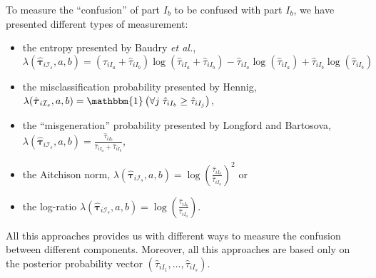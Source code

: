 \documentclass[10pt, a4paper]{article}
\newcommand{\m}[1]{\boldsymbol{#1}}
\begin{document}
To measure the ``confusion'' of part $I_b$ to be confused with part $I_b$, we have presented different types of measurement: 
\begin{itemize}
\item the entropy presented by Baudry \emph{et al.}, $\lambda(\hat{\m \tau}_{i \mathcal{I}_s}, a, b) = (\hat{\tau}_{iI_a}+\hat{\tau}_{iI_b}) \log(\hat{\tau}_{iI_a} + \hat{\tau}_{iI_b}) - \hat{\tau}_{iI_a} \log(\hat{\tau}_{iI_a}) + \hat{\tau}_{iI_b} \log(\hat{\tau}_{iI_b})$
\item the misclassification probability presented by Hennig, $\lambda(\hat{\m \tau}_{i \mathcal{I}_s}, a, b) = \mathbbm{1}\left( \forall j\; \hat{\tau}_{i I_{b}} \geq \hat{\tau}_{iI_j} \right)$,
\item the ``misgeneration'' probability presented by Longford and Bartosova, $\lambda(\hat{\m \tau}_{i \mathcal{I}_s}, a, b) = \frac{\hat{\tau}_{iI_b}}{\hat{\tau}_{iI_a} + \hat{\tau}_{iI_b}}$,
\item the Aitchison norm, $\lambda(\hat{\m \tau}_{i \mathcal{I}_s}, a, b) = \log (\frac{ \hat{\tau}_{iI_b} }{ \hat{\tau}_{iI_a} })^2$ or
\item the log-ratio $\lambda(\hat{\m \tau}_{i \mathcal{I}_s}, a, b) = \log (\frac{ \hat{\tau}_{iI_b} }{ \hat{\tau}_{iI_a} })$.
\end{itemize}
All this approaches provides us with different ways to measure the confusion between different components. Moreover, all this approaches are based only on the posterior probability 
vector $(\hat{\tau}_{i I_{1}}, \dots, \hat{\tau}_{i I_{s}})$. 
\end{document}

